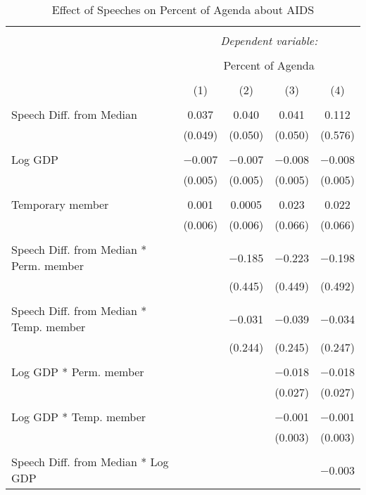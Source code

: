 
\begin{table}[!htbp] \centering 
  \caption{Effect of Speeches on Percent of Agenda about AIDS} 
  \label{} 
\begin{tabular}{@{\extracolsep{5pt}}lcccc} 
\\[-1.8ex]\hline 
\hline \\[-1.8ex] 
 & \multicolumn{4}{c}{\textit{Dependent variable:}} \\ 
\cline{2-5} 
\\[-1.8ex] & \multicolumn{4}{c}{Percent of Agenda} \\ 
\\[-1.8ex] & (1) & (2) & (3) & (4)\\ 
\hline \\[-1.8ex] 
 Speech Diff. from Median & 0.037 & 0.040 & 0.041 & 0.112 \\ 
  & (0.049) & (0.050) & (0.050) & (0.576) \\ 
  & & & & \\ 
 Log GDP & $-$0.007 & $-$0.007 & $-$0.008 & $-$0.008 \\ 
  & (0.005) & (0.005) & (0.005) & (0.005) \\ 
  & & & & \\ 
 Temporary member & 0.001 & 0.0005 & 0.023 & 0.022 \\ 
  & (0.006) & (0.006) & (0.066) & (0.066) \\ 
  & & & & \\ 
 Speech Diff. from Median * Perm. member &  & $-$0.185 & $-$0.223 & $-$0.198 \\ 
  &  & (0.445) & (0.449) & (0.492) \\ 
  & & & & \\ 
 Speech Diff. from Median * Temp. member &  & $-$0.031 & $-$0.039 & $-$0.034 \\ 
  &  & (0.244) & (0.245) & (0.247) \\ 
  & & & & \\ 
 Log GDP * Perm. member &  &  & $-$0.018 & $-$0.018 \\ 
  &  &  & (0.027) & (0.027) \\ 
  & & & & \\ 
 Log GDP * Temp. member &  &  & $-$0.001 & $-$0.001 \\ 
  &  &  & (0.003) & (0.003) \\ 
  & & & & \\ 
 Speech Diff. from Median * Log GDP &  &  &  & $-$0.003 \\ 

\end{tabular}
\end{table}
